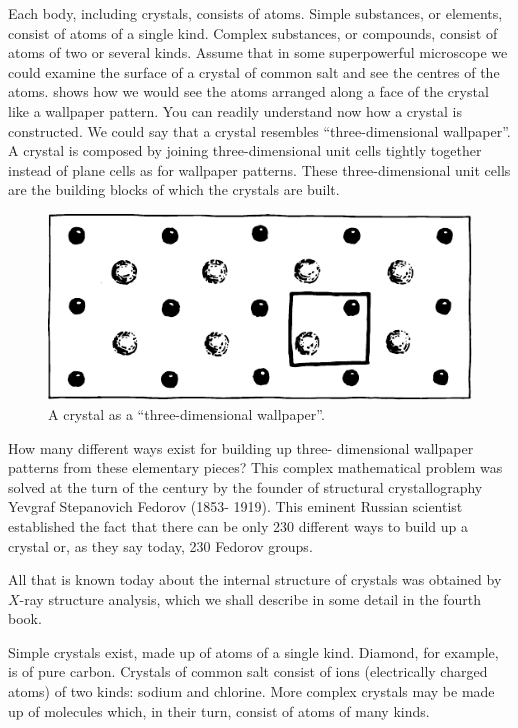Each body, including crystals, consists of atoms. Simple substances, or elements, consist of atoms of a single kind. Complex substances, or compounds, con­sist of atoms of two or several kinds. Assume that in some superpowerful microscope we could examine the surface of a crystal of common salt and see the centres of the atoms.  shows how we would see the atoms arranged along a face of the crystal like a wallpaper pattern. You can readily understand now how a crystal is constructed. We could say that a crystal resembles ``three-dimensional wallpaper''. A crystal is composed by joining three-dimensional unit cells tightly together instead of plane cells as for wallpaper patterns. These three-dimensional unit cells are the building blocks of which the crystals are built.

\begin{figure}[!ht]
\centering
\includegraphics[width=\textwidth]{figures/fig-02-13.pdf}
\caption{A crystal as a ``three-dimensional wallpaper''.}
\label{fig-2.13}
\end{figure}


How many different ways exist for building up three- dimensional wallpaper patterns from these elementary pieces? This complex mathematical problem was solved at the turn of the century by the founder of structural crystallography Yevgraf Stepanovich Fedorov (1853- 1919). This eminent Russian scientist established the fact that there can be only 230 different ways to build up a crystal or, as they say today, 230 Fedorov groups.

All that is known today about the internal structure of crystals was obtained by $X$-ray structure analysis, which we shall describe in some detail in the fourth book.

Simple crystals exist, made up of atoms of a single kind. Diamond, for example, is of pure carbon. Crystals of common salt consist of ions (electrically charged atoms) of two kinds: sodium and chlorine. More complex crystals may be made up of molecules which, in their turn, consist of atoms of many kinds.

